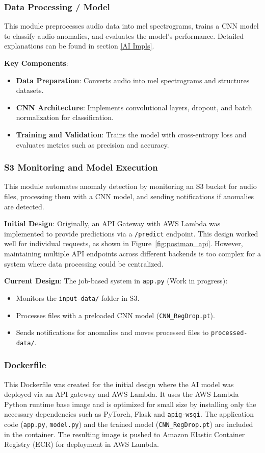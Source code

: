 \documentclass[conference]{IEEEtran}
\begin{document}
\subsubsection{Data Processing / Model}
This module preprocesses audio data into mel spectrograms, trains a CNN model to classify audio anomalies, and evaluates the model's performance. Detailed explanations can be found in section \ref{AI Impls}.

\textbf{Key Components}:
\begin{itemize}
    \item \textbf{Data Preparation}: Converts audio into mel spectrograms and structures datasets.
    \item \textbf{CNN Architecture}: Implements convolutional layers, dropout, and batch normalization for classification.
    \item \textbf{Training and Validation}: Trains the model with cross-entropy loss and evaluates metrics such as precision and accuracy.
\end{itemize}

\subsubsection{S3 Monitoring and Model Execution}
This module automates anomaly detection by monitoring an S3 bucket for audio files, processing them with a CNN model, and sending notifications if anomalies are detected. 

\textbf{Initial Design}: 
Originally, an API Gateway with AWS Lambda was implemented to provide predictions via a \texttt{/predict} endpoint. This design worked well for individual requests, as shown in Figure~\ref{fig:postman_api}. However, maintaining multiple API endpoints across different backends is too complex for a system where data processing could be centralized.  

\textbf{Current Design}: 
The job-based system in \texttt{app.py} (Work in progress):
\begin{itemize}
    \item Monitors the \texttt{input-data/} folder in S3.
    \item Processes files with a preloaded CNN model (\texttt{CNN\_RegDrop.pt}).
    \item Sends notifications for anomalies and moves processed files to \texttt{processed-data/}.
\end{itemize}

\subsubsection{Dockerfile}
This Dockerfile was created for the initial design where the AI model was deployed via an API gateway and AWS Lambda. It uses the AWS Lambda Python runtime base image and is optimized for small size by installing only the necessary dependencies such as PyTorch, Flask and \texttt{apig-wsgi}. 
The application code (\texttt{app.py}, \texttt{model.py}) and the trained model (\texttt{CNN\_RegDrop.pt}) are included in the container. The resulting image is pushed to Amazon Elastic Container Registry (ECR) for deployment in AWS Lambda.
\end{document}
